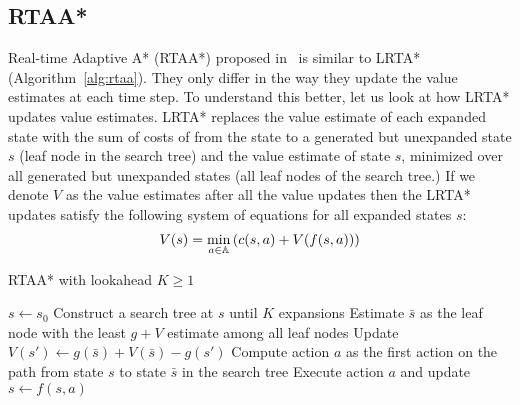 \subsection{RTAA*}
\label{sec:rtaa}

Real-time Adaptive A* (RTAA*) proposed
in~\cite{DBLP:conf/atal/KoenigL06} is similar to LRTA*
(Algorithm~\ref{alg:rtaa}). They only 
differ in the way they update the
value estimates at each time step. To understand this better, let us
look at how LRTA* updates value estimates. LRTA* replaces the value
estimate of each expanded state with the sum of costs of from the
state to a generated but unexpanded state $s$ (leaf node in the search
tree) and the value estimate of state $s$, minimized over all
generated but unexpanded states (all leaf nodes of the search tree.)
If we denote $V$ as the value estimates after all the value
updates then the LRTA* updates satisfy the following system of
equations for all expanded states $s$:
\begin{equation}
  \label{eq:10}
  V(s) = \min_{a \in \mathbb{A}}\left( c(s, a) + V(f(s, a)) \right)
\end{equation}

\begin{algorithm}[t]
  \caption{RTAA* with lookahead $K \geq 1$~\cite{DBLP:conf/atal/KoenigL06}}
  \begin{algorithmic}[1]
    \State $s \leftarrow s_0$
    \State Construct a search tree at $s$ until $K$ expansions
    \State Estimate $\bar{s}$ as the leaf node with the least $g + V$
    estimate among all leaf nodes
    \State Update $V(s') \leftarrow g(\bar{s}) + V(\bar{s}) - g(s')$
    \EndFor
    \State Compute action $a$ as the first action on the path from
    state $s$ to state $\bar{s}$ in the search tree
    \State Execute action $a$ and update $s \leftarrow f(s, a)$
    \EndWhile
  \end{algorithmic}
  \label{alg:rtaa}
\end{algorithm}

